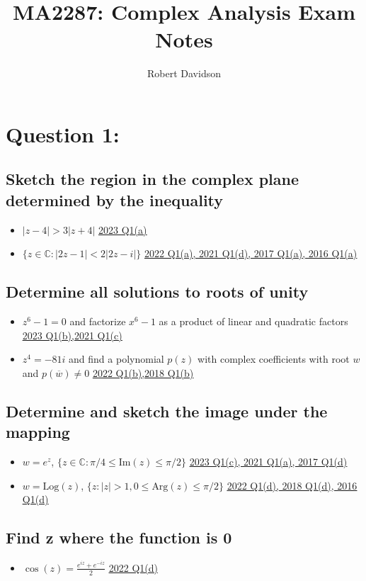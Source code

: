 \documentclass[a4paper, 8pt]{extarticle}
\title{
\textbf{MA2287: Complex Analysis Exam Notes} \\ 
}
\author{
  Robert Davidson
}
\date{} %
\begin{document}
\maketitle
\pagebreak
\tableofcontents
\pagebreak


\section{Question 1: }
\subsection{Sketch the region in the complex plane determined by the inequality}
\begin{itemize}
	\item $|z - 4| > 3|z+4|$ \hfill \hyperref[sol:2023Q1a]{\uline{2023 Q1(a)}}
	\item $\{ z \in \mathbb{C} : |2z - 1| < 2|2z-i|\}$ \hfill  \hyperref[sol:2022Q1a]{\uline{2022 Q1(a), 2021 Q1(d), 2017 Q1(a), 2016 Q1(a)}}
\end{itemize}
\subsection{Determine all solutions to roots of unity}
\begin{itemize}
	\item $z^6 -1 = 0$ and factorize $x^6 -1$ as a product of linear and quadratic factors \hfill \hyperref[sol:2023Q1b]{\uline{2023 Q1(b),2021 Q1(c)}}
	\item $z^4 = -81i$ and find a polynomial $p(z)$ with complex coefficients with root $w$ and $p(\overline{w}) \neq 0$ \hfill \hyperref[sol:20188Q1b]{\uline{2022 Q1(b),2018 Q1(b)}}

\end{itemize}
\subsection{Determine and sketch the image under the mapping}
\begin{itemize}
	\item $w = e^z$, $\{z \in \mathbb{C} : \pi / 4 \leq \text{Im}(z) \leq \pi /2\}$ \hfill \hyperref[sol:2023Q1c]{\uline{2023 Q1(c), 2021 Q1(a), 2017 Q1(d)}}
	\item $w = \text{Log}(z)$, $\{z: |z| > 1, 0 \leq \text{Arg}(z) \leq \pi / 2\}$  \hfill \hyperref[sol:2022Q1d]{\uline{2022 Q1(d), 2018 Q1(d), 2016 Q1(d)}}
\end{itemize}
\subsection{Find z where the function is 0}
\begin{itemize}
	\item $\cos(z) = \frac{e^{iz} + e^{-iz}}{2}$ \hfill \hyperref[sol:2023Q1d]{\uline{2022 Q1(d)}}
\end{itemize}
\end{document}
